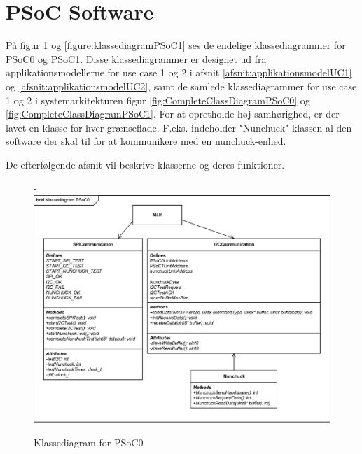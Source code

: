 \section{PSoC Software}
På figur \ref{figure:klassediagramPSoC0} og \ref{figure:klassediagramPSoC1} ses de endelige klassediagrammer for PSoC0 og PSoC1. Disse klassediagrammer er designet ud fra applikationsmodellerne for use case 1 og 2 i afsnit \ref{afsnit:applikationsmodelUC1} og \ref{afsnit:applikationsmodelUC2}, samt de samlede klassediagrammer for use case 1 og 2 i systemarkitekturen figur \ref{fig:CompleteClassDiagramPSoC0} og \ref{fig:CompleteClassDiagramPSoC1}. For at opretholde høj samhørighed, er der lavet en klasse for hver grænseflade. F.eks. indeholder "Nunchuck"-klassen al den software der skal til for at kommunikere med en nunchuck-enhed. 

De efterfølgende afsnit vil beskrive klasserne og deres funktioner.

\begin{figure}[H]
	\begin{adjustwidth}{-2cm}{-\rightmargin}
		\centering
		\includegraphics[width=1.35\textwidth]{DesignOgImplementering/images/PSoC0KlassediagramOversigt.pdf}
		\caption{Klassediagram for PSoC0}
		\label{figure:klassediagramPSoC0}
	\end{adjustwidth}
\end{figure}

